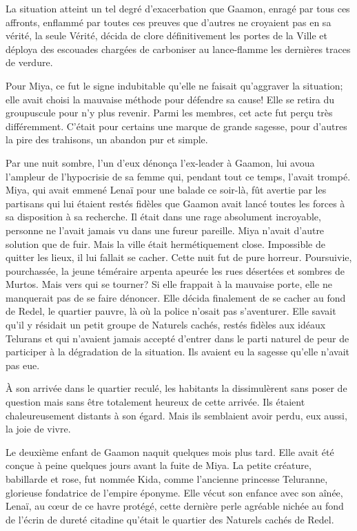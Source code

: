 La situation atteint un tel degré d'exacerbation que Gaamon, enragé par tous ces affronts, enflammé par toutes ces preuves que d'autres ne croyaient pas en sa vérité, la seule Vérité, décida de clore définitivement les portes de la Ville et déploya des escouades chargées de carboniser au lance-flamme les dernières traces de verdure.

Pour Miya, ce fut le signe indubitable qu'elle ne faisait qu'aggraver la situation; elle avait choisi la mauvaise méthode pour défendre sa cause! Elle se retira du groupuscule pour n'y plus revenir. Parmi les membres, cet acte fut perçu très différemment. C'était pour certains une marque de grande sagesse, pour d'autres la pire des trahisons, un abandon pur et simple.

Par une nuit sombre, l'un d'eux dénonça l'ex-leader à Gaamon, lui avoua l'ampleur de l'hypocrisie de sa femme qui, pendant tout ce temps, l'avait trompé. Miya, qui avait emmené Lenaï pour une balade ce soir-là, fût avertie par les partisans qui lui étaient restés fidèles que Gaamon avait lancé toutes les forces à sa disposition à sa recherche. Il était dans une rage absolument incroyable, personne ne l'avait jamais vu dans une fureur pareille. Miya n'avait d'autre solution que de fuir. Mais la ville était hermétiquement close. Impossible de quitter les lieux, il lui fallait se cacher. Cette nuit fut de pure horreur. Poursuivie, pourchassée, la jeune téméraire arpenta apeurée les rues désertées et sombres de Murtos. Mais vers qui se tourner? Si elle frappait à la mauvaise porte, elle ne manquerait pas de se faire dénoncer. Elle décida finalement de se cacher au fond de Redel, le quartier pauvre, là où la police n'osait pas s'aventurer. Elle savait qu'il y résidait un petit groupe de Naturels cachés, restés fidèles aux idéaux Telurans et qui n'avaient jamais accepté d'entrer dans le parti naturel de peur de participer à la dégradation de la situation. Ils avaient eu la sagesse qu'elle n'avait pas eue.

À son arrivée dans le quartier reculé, les habitants la dissimulèrent sans poser de question mais sans être totalement heureux de cette arrivée. Ils étaient chaleureusement distants à son égard. Mais ils semblaient avoir perdu, eux aussi, la joie de vivre.

Le deuxième enfant de Gaamon naquit quelques mois plus tard. Elle avait été conçue à peine quelques jours avant la fuite de Miya. La petite créature, babillarde et rose, fut nommée Kida, comme l'ancienne princesse Teluranne, glorieuse fondatrice de l'empire éponyme. Elle vécut son enfance avec son aînée, Lenaï, au c\oe ur de ce havre protégé, cette dernière perle agréable nichée au fond de l'écrin de dureté citadine qu'était le quartier des Naturels cachés de Redel.

